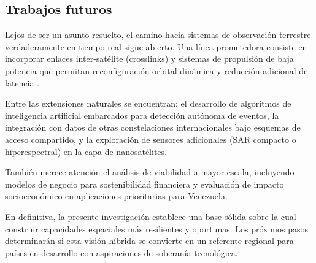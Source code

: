 \subsection{Trabajos futuros}

Lejos de ser un asunto resuelto, el camino hacia sistemas de observación terrestre verdaderamente en tiempo real sigue abierto. Una línea prometedora consiste en incorporar enlaces inter-satélite (crosslinks) y sistemas de propulsión de baja potencia que permitan reconfiguración orbital dinámica y reducción adicional de latencia \cite{Chan2024}.

Entre las extensiones naturales se encuentran: el desarrollo de algoritmos de inteligencia artificial embarcados para detección autónoma de eventos, la integración con datos de otras constelaciones internacionales bajo esquemas de acceso compartido, y la exploración de sensores adicionales (SAR compacto o hiperespectral) en la capa de nanosatélites. 

También merece atención el análisis de viabilidad a mayor escala, incluyendo modelos de negocio para sostenibilidad financiera y evaluación de impacto socioeconómico en aplicaciones prioritarias para Venezuela. 

En definitiva, la presente investigación establece una base sólida sobre la cual construir capacidades espaciales más resilientes y oportunas. Los próximos pasos determinarán si esta visión híbrida se convierte en un referente regional para países en desarrollo con aspiraciones de soberanía tecnológica.